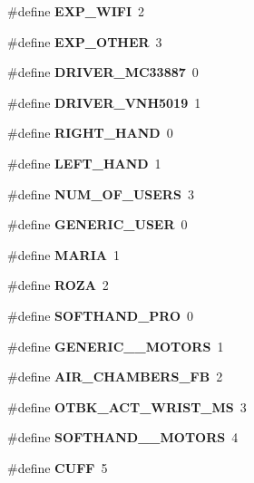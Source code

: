 \begin{DoxyCompactItemize}
\item 
\mbox{\label{globals_8h_a25767403f2ad21cf275206135269647e}} 
\#define {\bfseries E\+X\+P\+\_\+\+W\+I\+FI}~2
\item 
\mbox{\label{globals_8h_a265e7aabffe2182cd632b15dd02a9efb}} 
\#define {\bfseries E\+X\+P\+\_\+\+O\+T\+H\+ER}~3
\item 
\mbox{\label{globals_8h_a20e659d92cc540a195717f8cc2dd4b42}} 
\#define {\bfseries D\+R\+I\+V\+E\+R\+\_\+\+M\+C33887}~0
\item 
\mbox{\label{globals_8h_a2e6a13011f6123a8f0c064e37b116880}} 
\#define {\bfseries D\+R\+I\+V\+E\+R\+\_\+\+V\+N\+H5019}~1
\item 
\mbox{\label{globals_8h_a5d1d275cfec76197e014fe4d58f2e569}} 
\#define {\bfseries R\+I\+G\+H\+T\+\_\+\+H\+A\+ND}~0
\item 
\mbox{\label{globals_8h_a2eff09387fb5d20d8af4fa186ae37c4d}} 
\#define {\bfseries L\+E\+F\+T\+\_\+\+H\+A\+ND}~1
\item 
\mbox{\label{globals_8h_aa518fecbba4980ebda2090f02ceb5e52}} 
\#define {\bfseries N\+U\+M\+\_\+\+O\+F\+\_\+\+U\+S\+E\+RS}~3
\item 
\mbox{\label{globals_8h_ac524d0f906498efbd1182856cd8c80de}} 
\#define {\bfseries G\+E\+N\+E\+R\+I\+C\+\_\+\+U\+S\+ER}~0
\item 
\mbox{\label{globals_8h_a8595fed7fe248547047c468802057a0d}} 
\#define {\bfseries M\+A\+R\+IA}~1
\item 
\mbox{\label{globals_8h_a7617063d52fc2d1ba6d0276770aec732}} 
\#define {\bfseries R\+O\+ZA}~2
\item 
\mbox{\label{globals_8h_a47a1fa8e1e5435f664749ab44e163bae}} 
\#define {\bfseries S\+O\+F\+T\+H\+A\+N\+D\+\_\+\+P\+RO}~0
\item 
\mbox{\label{globals_8h_a577f879b1a05acd55b1d56412a17e13f}} 
\#define {\bfseries G\+E\+N\+E\+R\+I\+C\+\_\+\_\+\+M\+O\+T\+O\+RS}~1
\item 
\mbox{\label{globals_8h_ad854ddb03952eb3f1d2e2282bbf21eb4}} 
\#define {\bfseries A\+I\+R\+\_\+\+C\+H\+A\+M\+B\+E\+R\+S\+\_\+\+FB}~2
\item 
\mbox{\label{globals_8h_ab92ee899bc7746a7148fa06da5a121a6}} 
\#define {\bfseries O\+T\+B\+K\+\_\+\+A\+C\+T\+\_\+\+W\+R\+I\+S\+T\+\_\+\+MS}~3
\item 
\mbox{\label{globals_8h_a3c105963a392309caa76708290acd589}} 
\#define {\bfseries S\+O\+F\+T\+H\+A\+N\+D\+\_\+\_\+\+M\+O\+T\+O\+RS}~4
\item 
\mbox{\label{globals_8h_ac5a0bd9be15f1dcd0ba86f27d3dbda50}} 
\#define {\bfseries C\+U\+FF}~5

\end{DoxyCompactItemize}
